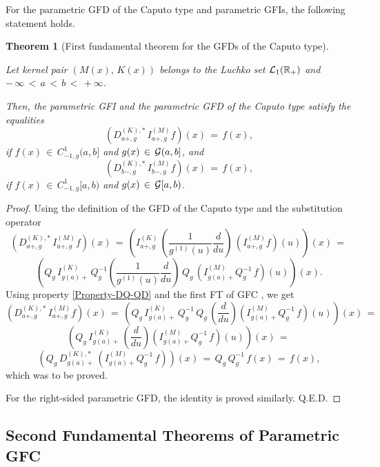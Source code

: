 \documentclass[12pt]{article}
\newtheorem{Theorem}{Theorem}
\begin{document}
For the parametric GFD of the Caputo type and parametric GFIs, 
the following statement holds.


\begin{Theorem}[First fundamental theorem for the GFDs of the Caputo type]
\label{FT-1-C}

Let kernel pair $(M(x), \, K(x))$ belongs to the Luchko set ${\cal L}_{1}(\mathbb{R}_{+})$ and
$ - \, \infty \, < \, a \, < \, b \, < \, +\infty$.

Then, the parametric GFI and the parametric GFD of the Caputo type satisfy the equalities
\[
(D^{(K),*}_{a+,g} \, I^{(M)}_{a+,g} f)(x) \, = \, f(x) ,
\]
if $f(x) \, \in \, C^{1}_{-1,g}(a,b]$ 
and $g(x) \, \in \, {\cal G}(a,b]$, and 
\[
(D^{(K),*}_{b-,g} \, I^{(M)}_{b-,g} f)(x) \, = \, f(x) ,
\]
if $f(x) \, \in \, C^{1}_{-1,g}[a,b)$ 
and $g(x) \, \in \, {\cal G}[a,b)$. 
\end{Theorem}

\begin{proof}
Using the definition of the GFD of the Caputo type and the substitution operator
\[
(D^{(K),*}_{a+,g} \, I^{(M)}_{a+,g} f)(x) \, = \, 
\left(I^{(K)}_{a+,g} \, 
\left(\frac{1}{g^{(1)}(u)} \frac{d}{du} \right)\, (I^{(M)}_{a+,g} f)(u) \right)(x) \, = \, 
\]
\[
\left(Q_g \, I^{(K)}_{g(a)+} \, Q^{-1}_g
\left(\frac{1}{g^{(1)}(u)} \frac{d}{du} \right) \, 
Q_g \, (I^{(M)}_{g(a)+} Q^{-1}_g \, f)(u) \right)(x) .
\]
Using property \eqref{Property-DQ-QD} and the first FT of GFC \cite{Luchko2023}, we get
\[
(D^{(K),*}_{a+,g} \, I^{(M)}_{a+,g} f)(x) \, = \, 
\left(Q_g \, I^{(K)}_{g(a)+} \, Q^{-1}_g \, Q_g \,
\left( \frac{d}{du} \right) (I^{(M)}_{g(a)+} Q^{-1}_g \, f)(u) \right)(x) \, = \, 
\]
\[
\left(Q_g \, I^{(K)}_{g(a)+} \, 
\left( \frac{d}{du} \right) (I^{(M)}_{g(a)+} Q^{-1}_g \, f)(u) \right)(x) \, = \, 
\]
\[
\left(Q_g \, D^{(K),*}_{g(a)+} \,
(I^{(M)}_{g(a)+} Q^{-1}_g \, f) \right)(x) \, = \, 
Q_g \, Q^{-1}_g \, f(x) \, = \, f(x) ,
\]
which was to be proved. 

For the right-sided parametric GFD, the identity is proved similarly.
Q.E.D.
\end{proof}



\subsection{Second Fundamental Theorems of Parametric GFC}
\end{document}
